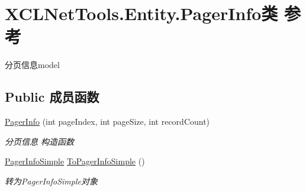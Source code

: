 \hypertarget{class_x_c_l_net_tools_1_1_entity_1_1_pager_info}{}\section{X\+C\+L\+Net\+Tools.\+Entity.\+Pager\+Info类 参考}
\label{class_x_c_l_net_tools_1_1_entity_1_1_pager_info}


分页信息model  


\subsection*{Public 成员函数}
\begin{DoxyCompactItemize}
\item 
\hyperlink{class_x_c_l_net_tools_1_1_entity_1_1_pager_info_a942f7268d84ce1d1533b678acb7104c6}{Pager\+Info} (int page\+Index, int page\+Size, int record\+Count)
\begin{DoxyCompactList}\small\item\em 分页信息 构造函数 \end{DoxyCompactList}\item 
\hyperlink{class_x_c_l_net_tools_1_1_entity_1_1_pager_info_simple}{Pager\+Info\+Simple} \hyperlink{class_x_c_l_net_tools_1_1_entity_1_1_pager_info_af2b14d5cb33aa660580dc612a0f7b6c8}{To\+Pager\+Info\+Simple} ()
\begin{DoxyCompactList}\small\item\em 转为\+Pager\+Info\+Simple对象 \end{DoxyCompactList}\end{DoxyCompactItemize}
